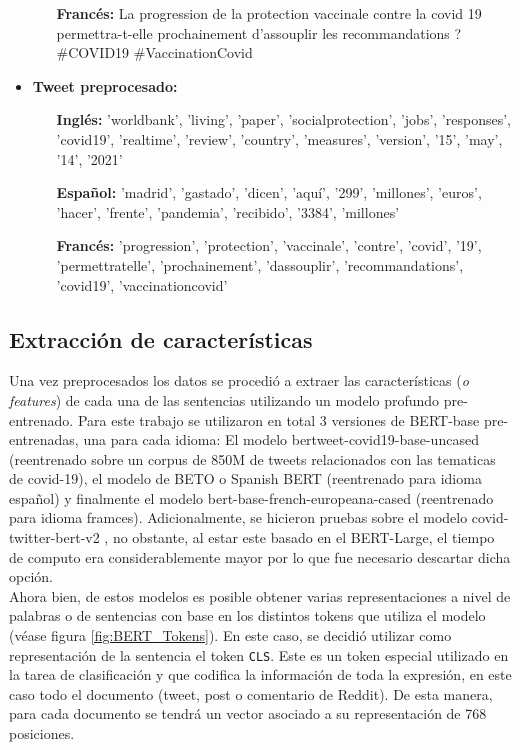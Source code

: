 \begin{itemize}
\begin{itemize}
        \item [\textbf{Francés:}] La progression de la protection vaccinale contre la covid 19 permettra-t-elle prochainement d'assouplir les recommandations ? \#COVID19 \#VaccinationCovid 
    \end{itemize}
    \item \textbf{Tweet preprocesado:}\\ 
    \begin{itemize}
        \item [\textbf{Inglés:}] 'worldbank', 'living', 'paper', 'socialprotection', 'jobs', 'responses', 'covid19', 'realtime', 'review', 'country', 'measures', 'version', '15', 'may', '14', '2021'
        \item [\textbf{Español:}] 'madrid', 'gastado', 'dicen', 'aquí', '299', 'millones', 'euros', 'hacer', 'frente', 'pandemia', 'recibido', '3384', 'millones'
        \item [\textbf{Francés:}] 'progression', 'protection', 'vaccinale', 'contre', 'covid', '19', 'permettratelle', 'prochainement', 'dassouplir', 'recommandations', 'covid19', 'vaccinationcovid'
    \end{itemize}
\end{itemize}

\subsection{Extracción de características}

Una vez preprocesados los datos se procedió a extraer las características (\textit{o features}) de cada una de las sentencias utilizando un modelo profundo pre-entrenado. Para este trabajo se utilizaron en total 3 versiones de BERT-base pre-entrenadas, una para cada idioma: El modelo 
bertweet-covid19-base-uncased \cite{bertweet} (reentrenado sobre un corpus de 850M de tweets relacionados con las tematicas de covid-19), el modelo de BETO o Spanish BERT \cite{CaneteCFP2020} (reentrenado para idioma español) y finalmente el modelo bert-base-french-europeana-cased (reentrenado para idioma framces). Adicionalmente, se hicieron pruebas sobre el modelo covid-twitter-bert-v2 \cite{muller2020covid}, no obstante, al estar este basado en el BERT-Large, el tiempo de computo era considerablemente mayor por lo que fue necesario descartar dicha opción. \\

Ahora bien, de estos modelos es posible obtener varias representaciones a nivel de palabras o de sentencias con base en los distintos tokens que utiliza el modelo (véase figura \ref{fig:BERT_Tokens}). En este caso, se decidió utilizar como representación de la sentencia el token \texttt{CLS}. Este es un token especial utilizado en la tarea de clasificación y que codifica la información de toda la expresión, en este caso todo el documento (tweet,  post o comentario de Reddit). De esta manera, para cada documento se tendrá un vector asociado a su representación de 768 posiciones. 

